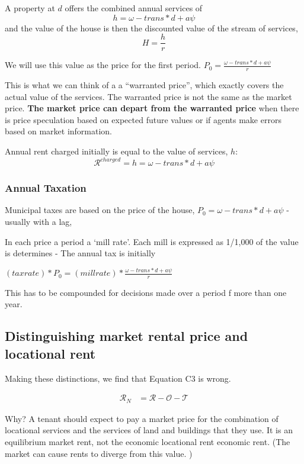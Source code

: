 A property at $d$ offers the combined annual services of 
\[h=\omega- trans * d + a\psi\]
and the value of the house is then the discounted value of the stream of services,
\[H=\frac{h}{r}\]

We will use this value as the price for the first period. 
 $P_0=\frac{\omega- trans * d + a\psi}{r}$

This is what we can think of a a ``warranted price'', which exactly covers the actual value of the services. The warranted price  is not the same as the market price.  \textbf{The market price can depart from the warranted price} when there is price speculation based on expected future values or if agents make errors based on market information.

Annual rent charged initially is  equal to the value of services, $h$:
\[\mathcal R^{charged}= h= \omega- trans * d + a\psi\]



\subsubsection{Annual Taxation}
Municipal taxes are based on the price of the house, $P_0=\omega- trans * d + a\psi$ - usually with a lag, 

In each price a period a `mill rate'. Each mill is  expressed as  1/1,000 of the value is determines - The annual tax is initially

 $(taxrate)*P_0=(millrate)*\frac{\omega- trans * d + a\psi}{r}$

This has to be compounded for decisions made over a period f more than one year.


\subsection{Distinguishing market rental price and locational rent}



Making these distinctions, we find that Equation C3 is wrong.

\begin{align}
\mathcal{R}_N &= \mathcal{R} - \mathcal{O} - \mathcal{T}
\end{align}

Why?  A tenant should expect to pay a market price for the combination of locational services and the services of land and buildings that they use.  It is an equilibrium market rent, not the economic locational rent economic rent. (The market can cause rents to diverge from this value. ) 

